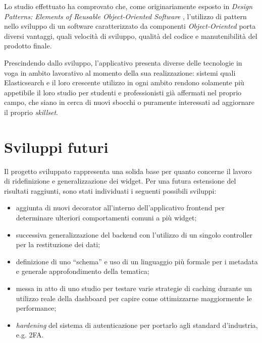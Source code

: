 Lo studio effettuato ha comprovato che, come originariamente esposto in \textit{Design Patterns: Elements of Reusable Object-Oriented Software} \cite{GOF}, l'utilizzo di pattern nello sviluppo di un software caratterizzato da componenti \textit{Object-Oriented} porta diversi vantaggi, quali velocità di sviluppo, qualità del codice e manutenibilità del prodotto finale.

Prescindendo dallo sviluppo, l'applicativo presenta diverse delle tecnologie in voga in ambito lavorativo al momento della sua realizzazione: sistemi quali Elasticsearch e il loro crescente utilizzo in ogni ambito rendono solamente più appetibile il loro studio per studenti e professionisti già affermati nel proprio campo, che siano in cerca di nuovi sbocchi o puramente interessati ad aggiornare il proprio \textit{skillset}.

 

\chapter{Sviluppi futuri}
Il progetto sviluppato rappresenta una solida base per quanto concerne il lavoro di ridefinizione e generalizzazione dei widget. Per una futura estensione del risultati raggiunti, sono stati individuati i seguenti possibili sviluppi:
\begin{itemize}
    \item aggiunta di nuovi decorator all'interno dell'applicativo frontend per determinare ulteriori comportamenti comuni a più widget;
    \item successiva generalizzazione del backend con l'utilizzo di un singolo controller per la restituzione dei dati;
    \item definizione di uno ``schema'' e uso di un linguaggio più formale per i metadata e generale approfondimento della tematica;
    \item messa in atto di uno studio per testare varie strategie di caching durante un utilizzo reale della dashboard per capire come ottimizzarne maggiormente le performance;
    \item \textit{hardening} del sistema di autenticazione per portarlo agli standard d'industria, e.g. 2FA.
\end{itemize}